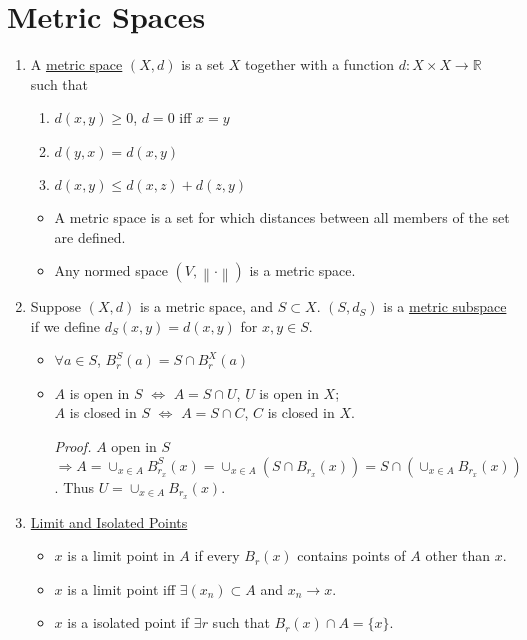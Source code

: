 \documentclass[%
 aip,
 jmp,%
 amsmath,amssymb,
 reprint,%
]{revtex4-1}
\def\R{{\mathbb R}}
\renewenvironment{proof}{\color{gray}\footnotesize\emph{Proof.}}{}
\newcommand{\norm}[1]{\left\lVert#1\right\rVert}
\newcommand{\imply}{\Rightarrow}
\renewcommand{\iff}{\Leftrightarrow}
\newcommand{\defn}[1]{\underline{#1}}
\begin{document}
\section{Metric Spaces}
\begin{enumerate}
  \item A \defn{metric space} $(X,d)$ is a set $X$ together with a function
  $d:X\times X \to\R$ such that
      \begin{enumerate}
        \item $d(x,y) \ge 0$, $d=0$ iff $x=y$
        \item $d(y,x) = d(x,y)$
        \item $d(x,y) \le d(x,z) + d(z,y)$
      \end{enumerate}
      \begin{itemize}
        \item {\footnotesize A metric space is a set for which distances
        between all members of the set are defined.}
        \item Any normed space $(V, \norm{\cdot})$ is a metric space.
      \end{itemize}

  \item Suppose $(X,d)$ is a metric space, and $S\subset X$.
  $(S,d_S)$ is a \defn{metric subspace} if we define
  $d_S(x,y) = d(x,y)$ for $x,y\in S$.
      \begin{itemize}
        \item $\forall a\in S$, $B_r^S(a) = S \cap B_r^X(a)$
        \item
        $A$ is open in $S$ $\iff$ $A=S\cap U$, $U$ is open in $X$;\\
        $A$ is closed in $S$ $\iff$ $A=S\cap C$, $C$ is closed in $X$.

          \begin{proof}
            $A$ open in $S$ $\imply A=\cup_{x\in A}B_{r_x}^{S}(x) =
            \cup_{x\in A}(S\cap B_{r_x}(x)) =
            S \cap (\cup_{x\in A}B_{r_x}(x))$.
            Thus $U = \cup_{x\in A}B_{r_x}(x)$.
          \end{proof}

      \end{itemize}

  \item \defn{Limit and Isolated Points}
      \begin{itemize}
        \item $x$ is a limit point in $A$ if every $B_r(x)$ contains points of
        $A$ other than $x$.
        \item $x$ is a limit point iff $\exists(x_n)\subset A$ and $x_n \to x$.
        \item $x$ is a isolated point if $\exists r$ such that $B_r(x)\cap A=\{x\}$.
      \end{itemize}


\end{enumerate}
\end{document}
